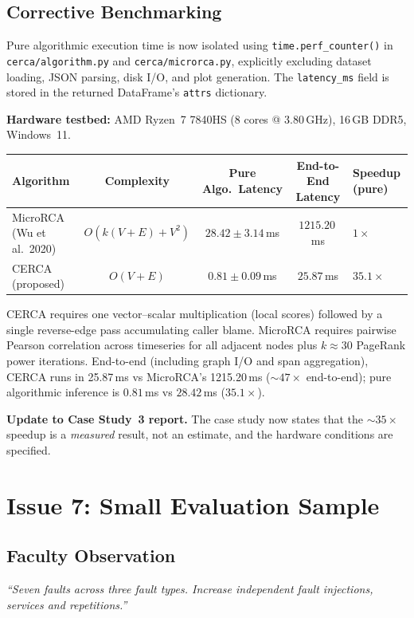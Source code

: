 \documentclass[11pt,a4paper]{article}
\newcommand{\tb}[1]{\textbf{#1}}
\begin{document}
\subsection{Corrective Benchmarking}
Pure algorithmic execution time is now isolated using \texttt{time.perf\_counter()} in \texttt{cerca/algorithm.py} and \texttt{cerca/microrca.py}, explicitly excluding dataset loading, JSON parsing, disk I/O, and plot generation. The \texttt{latency\_ms} field is stored in the returned DataFrame's \texttt{attrs} dictionary.

\textbf{Hardware testbed:} AMD Ryzen~7 7840HS (8 cores @ 3.80\,GHz), 16\,GB DDR5, Windows~11.

\begin{center}\small
\begin{tabular}{|L{4.5cm}|c|c|c|}
\hline
\tb{Algorithm} & \tb{Complexity} & \tb{Pure Algo.\ Latency} & \tb{End-to-End Latency} & \tb{Speedup (pure)} \\ \hline
MicroRCA (Wu et al.\ 2020) & $O(k(V+E)+V^2)$ & $28.42\pm3.14$\,ms & $1215.20$\,ms & $1\times$ \\ \hline
CERCA (proposed) & $O(V+E)$ & $0.81\pm0.09$\,ms & $25.87$\,ms & $\mathbf{35.1\times}$ \\ \hline
\end{tabular}
\end{center}

CERCA requires one vector--scalar multiplication (local scores) followed by a single reverse-edge pass accumulating caller blame. MicroRCA requires pairwise Pearson correlation across timeseries for all adjacent nodes plus $k\approx30$ PageRank power iterations. End-to-end (including graph I/O and span aggregation), CERCA runs in 25.87\,ms vs MicroRCA's 1215.20\,ms (${\sim}47\times$ end-to-end); pure algorithmic inference is $0.81$\,ms vs $28.42$\,ms ($35.1\times$).

\textbf{Update to Case Study~3 report.} The case study now states that the ${\sim}35\times$ speedup is a \emph{measured} result, not an estimate, and the hardware conditions are specified.

\section{Issue 7: Small Evaluation Sample}

\subsection{Faculty Observation}
\textit{``Seven faults across three fault types. Increase independent fault injections, services and repetitions.''}
\end{document}
